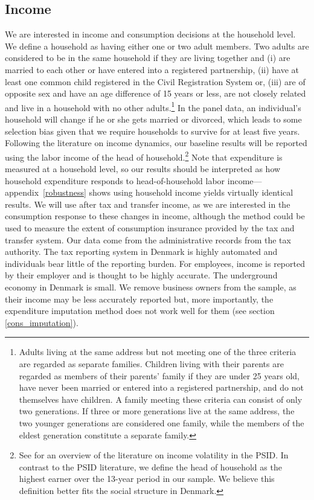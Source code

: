 \documentclass[titlepage]{\econtex}\newcommand{\texname}{ConsumptionHeterogeneity}
\begin{document}
	\subsection{Income} \label{income}
	We are interested in income and consumption decisions at the household level. We define a household as having either one or two adult members. Two adults are considered to be in the same household if they are living together and (i) are married to each other or have entered into a registered partnership, (ii) have at least one common child registered in the Civil Registration System or, (iii) are of opposite sex and have an age difference of 15 years or less, are not closely related and live in a household with no other adults.\footnote{Adults living at the same address but not meeting one of the three criteria are regarded as separate families. Children living with their parents are regarded as members of their parents' family if they are under 25 years old, have never been married or entered into a registered partnership, and do not themselves have children. A family meeting these criteria can consist of only two generations. If three or more generations live at the same address, the two younger generations are considered one family, while the members of the eldest generation constitute a separate family.} In the panel data, an individual's household will change if he or she gets married or divorced, which leads to some selection bias given that we require households to survive for at least five years. Following the literature on income dynamics, our baseline results will be reported using the labor income of the head of household.\footnote{See \cite{moffitt_income_2018} for an overview of the literature on income volatility in the PSID. In contrast to the PSID literature, we define the head of household as the highest earner over the 13-year period in our sample. We believe this definition better fits the social structure in Denmark.}
	Note that expenditure is measured at a household level, so our results should be interpreted as how household expenditure responds to head-of-household labor income---appendix~\ref{robustness} shows using household income yields virtually identical results.
	We will use after tax and transfer income, as we are interested in the consumption response to these changes in income, although the method could be used to measure the extent of consumption insurance provided by the tax and transfer system. Our data come from the administrative records from the tax authority. The tax reporting system in Denmark is highly automated and individuals bear little of the reporting burden. For employees, income is reported by their employer and is thought to be highly accurate. The underground economy in Denmark is small. We remove business owners from the sample, as their income may be less accurately reported but, more importantly, the expenditure imputation method does not work well for them (see section \ref{cons_imputation}).
	
\end{document}
